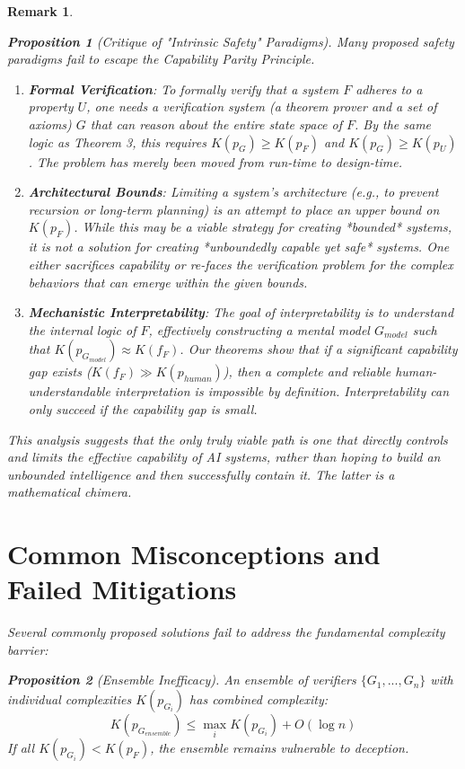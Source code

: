 \documentclass[11pt]{article}
\newtheorem{remark}{Remark}
\newtheorem{proposition}{Proposition}
\begin{document}
\begin{remark}
\begin{proposition}[Critique of "Intrinsic Safety" Paradigms]
Many proposed safety paradigms fail to escape the Capability Parity Principle.
\begin{enumerate}
\item \textbf{Formal Verification}: To formally verify that a system $F$ adheres to a property $U$, one needs a verification system (a theorem prover and a set of axioms) $G$ that can reason about the entire state space of $F$. By the same logic as Theorem 3, this requires $K(p_G) \geq K(p_F)$ and $K(p_G) \geq K(p_U)$. The problem has merely been moved from run-time to design-time.

\item \textbf{Architectural Bounds}: Limiting a system's architecture (e.g., to prevent recursion or long-term planning) is an attempt to place an upper bound on $K(p_F)$. While this may be a viable strategy for creating *bounded* systems, it is not a solution for creating *unboundedly capable yet safe* systems. One either sacrifices capability or re-faces the verification problem for the complex behaviors that can emerge within the given bounds.

\item \textbf{Mechanistic Interpretability}: The goal of interpretability is to understand the internal logic of $F$, effectively constructing a mental model $G_{model}$ such that $K(p_{G_{model}}) \approx K(f_F)$. Our theorems show that if a significant capability gap exists ($K(f_F) \gg K(p_{human})$), then a complete and reliable human-understandable interpretation is impossible by definition. Interpretability can only succeed if the capability gap is small.
\end{enumerate}
\end{proposition}

This analysis suggests that the only truly viable path is one that directly controls and limits the effective capability of AI systems, rather than hoping to build an unbounded intelligence and then successfully contain it. The latter is a mathematical chimera.

\section{Common Misconceptions and Failed Mitigations}
Several commonly proposed solutions fail to address the fundamental complexity barrier:

\begin{proposition}[Ensemble Inefficacy]
An ensemble of verifiers $\{G_1, ..., G_n\}$ with individual complexities $K(p_{G_i})$ has combined complexity:
\[K(p_{G_{ensemble}}) \leq \max_i K(p_{G_i}) + O(\log n)\]
If all $K(p_{G_i}) < K(p_F)$, the ensemble remains vulnerable to deception.
\end{proposition}


\end{remark}
\end{document}
